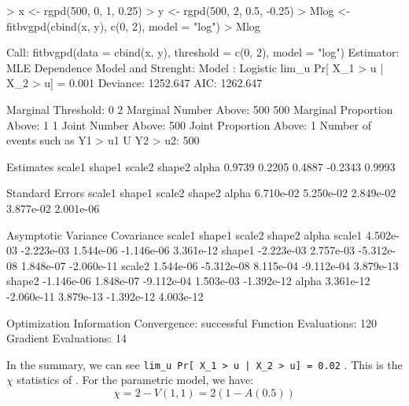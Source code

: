 \documentclass[a4paper]{article}
\numberwithin{equation}{section}
\theoremstyle{definition}
\begin{document}
\begin{Schunk}
\begin{Sinput}
> x <- rgpd(500, 0, 1, 0.25)
> y <- rgpd(500, 2, 0.5, -0.25)
> Mlog <- fitbvgpd(cbind(x, y), c(0, 2), model = "log")
> Mlog
\end{Sinput}
\begin{Soutput}
Call: fitbvgpd(data = cbind(x, y), threshold = c(0, 2), model = "log") 
Estimator: MLE 
Dependence Model and Strenght:
	Model : Logistic 
	lim_u Pr[ X_1 > u | X_2 > u] = 0.001 
Deviance: 1252.647 
     AIC: 1262.647 

Marginal Threshold: 0 2 
Marginal Number Above: 500 500 
Marginal Proportion Above: 1 1 
Joint Number Above: 500 
Joint Proportion Above: 1 
Number of events such as {Y1 > u1} U {Y2 > u2}: 500 

Estimates
 scale1   shape1   scale2   shape2    alpha  
 0.9739   0.2205   0.4887  -0.2343   0.9993  

Standard Errors
   scale1     shape1     scale2     shape2      alpha  
6.710e-02  5.250e-02  2.849e-02  3.877e-02  2.001e-06  

Asymptotic Variance Covariance
        scale1      shape1      scale2      shape2      alpha     
scale1   4.502e-03  -2.223e-03   1.544e-06  -1.146e-06   3.361e-12
shape1  -2.223e-03   2.757e-03  -5.312e-08   1.848e-07  -2.060e-11
scale2   1.544e-06  -5.312e-08   8.115e-04  -9.112e-04   3.879e-13
shape2  -1.146e-06   1.848e-07  -9.112e-04   1.503e-03  -1.392e-12
alpha    3.361e-12  -2.060e-11   3.879e-13  -1.392e-12   4.003e-12

Optimization Information
	Convergence: successful 
	Function Evaluations: 120 
	Gradient Evaluations: 14 
\end{Soutput}
\end{Schunk}

In the summary, we can see \verb+lim_u Pr[ X_1 > u | X_2 > u] = 0.02+
. This is the $\chi$ statistics of \citet{Coles1999}. For the
parametric model, we have:
\begin{displaymath}
  \chi = 2 - V(1,1) = 2 \left(1 - A(0.5) \right)
\end{displaymath}
\end{document}
